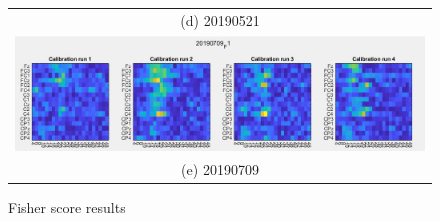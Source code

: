 \begin{figure}
\begin{tabular}{cc}
    \multicolumn{2}{c}{(d) 20190521}\\
    \multicolumn{2}{c}{\includegraphics[width=1\textwidth]{Figure/20190709_FS.JPG} }\\
    \multicolumn{2}{c}{(e) 20190709}\\

\end{tabular}
\caption{Fisher score results}
\end{figure}




